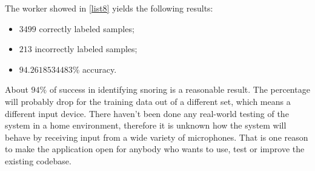 


The worker showed in \ref{list8}  yields the following results:

\begin{itemize}[topsep=5pt, partopsep=0pt,itemsep=3pt,parsep=1pt]
 \item $3499$ correctly labeled samples;
 \item $213$ incorrectly labeled samples;
 \item $94.2618534483\%$ accuracy. 
\end{itemize}

About $94\%$ of success in identifying snoring is a reasonable result. The percentage will probably drop for the training data out of a different set, which means a different input device. There haven't been done any real-world testing of the system in a home environment, therefore it is unknown how the system will behave by receiving input from a wide variety of microphones. That is one reason to make the application open for anybody who wants to use, test or improve the existing codebase. 

\clearpage